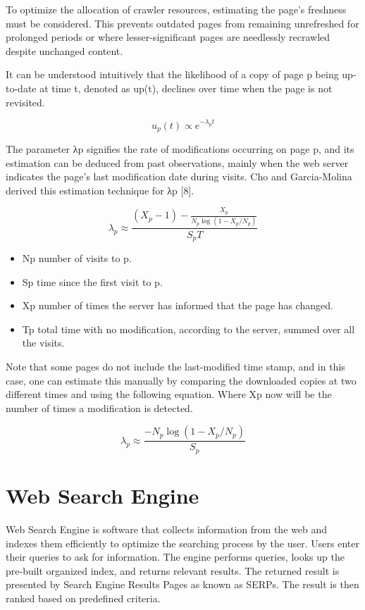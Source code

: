 To optimize the allocation of crawler resources, estimating the page's freshness must be considered. This prevents outdated pages from remaining unrefreshed for prolonged periods or where lesser-significant pages are needlessly recrawled despite unchanged content.


It can be understood intuitively that the likelihood of a copy of page p being up-to-date at time t, denoted as up(t), declines over time when the page is not revisited.

\begin{equation}
u_p(t) \propto e^{-\lambda_pt}
\label{eq:depth}
\end{equation}

The parameter λp signifies the rate of modifications occurring on page p, and its estimation can be deduced from past observations, mainly when the web server indicates the page's last modification date during visits. Cho and Garcia-Molina derived this estimation technique for λp [8].

\begin{equation}
\lambda_p \approx \frac{(X_p-1) - \frac{X_p}{N_p\log(1-X_p/N_p)}}{S_pT}
\label{eq:depth}
\end{equation}

\begin{itemize}
  \item Np number of visits to p.  
  \item Sp time since the first visit to p.
\item Xp number of times the server has informed that the page has changed.
\item Tp total time with no modification, according to the server, summed over all the visits.
\end{itemize}

Note that some pages do not include the last-modified time stamp, and in this case, one can estimate this manually by comparing the
downloaded copies at two different times and using the following equation. Where Xp now will be the number of times a modification is detected.

\begin{equation}
\lambda_p \approx \frac{-N_p\log(1-X_p/N_p)}{S_p}
\label{eq:depth}
\end{equation}

\section{Web Search Engine}
Web Search Engine is software that collects information from the web and indexes them efficiently to optimize the searching process by the user. Users enter their queries to ask for information. The engine performs queries, looks up the pre-built organized index, and returns relevant results. The returned result is presented by Search Engine Results Pages as known as SERPs. The result is then ranked based on predefined criteria. 

